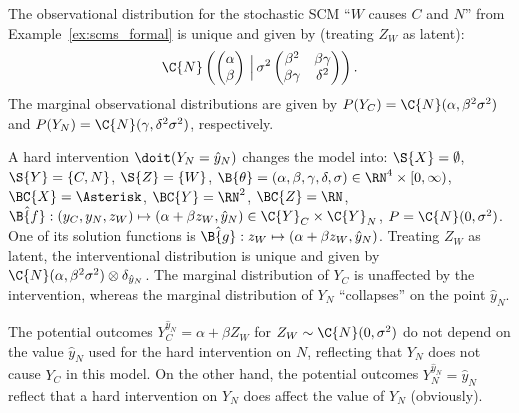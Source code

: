 \begin{Eg}
  The observational distribution for the stochastic SCM ``$W$ causes $C$ and $N$'' from Example~\ref{ex:scms_formal} is
  unique and given by (treating $Z_W$ as latent):
  $$\C{N}\left( \begin{pmatrix}\alpha \\ \beta\end{pmatrix} \,\Big|\, \sigma^2 \begin{pmatrix} \beta^2 & \beta\gamma \\ \beta\gamma & \delta^2 \end{pmatrix} \right).$$
  The marginal observational distributions are given by $P(Y_C) = \C{N}(\alpha,\beta^2\sigma^2)$ and $P(Y_N) = \C{N}(\gamma,\delta^2\sigma^2)$, respectively.

  A hard intervention $\doit(Y_N=\hat{y}_N)$ changes the model into:
  $\S{X} = \emptyset$, $\S{Y} = \{C,N\}$, $\S{Z} = \{W\}$, $\B{\theta} = (\alpha,\beta,\gamma,\delta,\sigma) \in \RN^4 \times [0,\infty)$, 
  $\BC{X} = \Asterisk$, $\BC{Y} = \RN^2$, $\BC{Z} = \RN$, $\hat{\B{f}} : (y_C, y_N, z_W) \mapsto (\alpha + \beta z_W, \hat{y}_N) \in \C{Y}_C \times \C{Y}_N$, $P = \C{N}(0,\sigma^2)$.
  One of its solution functions is $\hat{\B{g}} : z_W \mapsto (\alpha + \beta z_W, \hat{y}_N)$. 
  Treating $Z_W$ as latent, the interventional distribution is unique and given by $\C{N}(\alpha,\beta^2 \sigma^2) \otimes \delta_{\hat{y}_N}$. The marginal distribution of $Y_C$ is unaffected by the intervention, whereas the marginal distribution of $Y_N$ ``collapses'' on the point $\hat{y}_N$.

  The potential outcomes $Y_C^{\hat{y}_N} = \alpha + \beta Z_W$ for
  $Z_W \sim \C{N}(0,\sigma^2)$ do not depend on the value $\hat{y}_N$ used for the hard intervention on $N$,
  reflecting that $Y_N$ does not cause $Y_C$ in this model. On the other hand,
  the potential outcomes $Y_N^{\hat{y}_N} = \hat{y}_N$ reflect that a hard intervention on
  $Y_N$ does affect the value of $Y_N$ (obviously).
\end{Eg}

